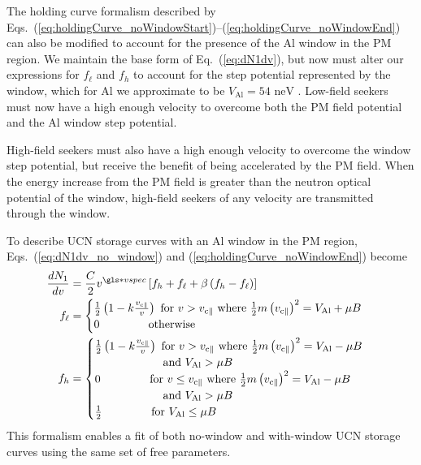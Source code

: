 The holding curve formalism described by Eqs.~(\ref{eq:holdingCurve_noWindowStart})--(\ref{eq:holdingCurve_noWindowEnd}) can also be modified to account for the presence of the Al window in the PM region. We maintain the base form of Eq.~(\ref{eq:dN1dv}), but now must alter our expressions for $f_\ell$ and $f_h$ to account for the step potential represented by the window, which for Al we approximate to be $V_\text{Al}=54\text{ neV}$ \cite{golubUCN}. Low-field seekers must now have a high enough velocity to overcome both the PM field potential and the Al window step potential. 

High-field seekers must also have a high enough velocity to overcome the window step potential, but receive the benefit of being accelerated by the PM field. When the energy increase from the PM field is greater than the neutron optical potential of the window, high-field seekers of any velocity are transmitted through the window.

To describe UCN storage curves with an Al window in the PM region, Eqs.~(\ref{eq:dN1dv_no_window}) and (\ref{eq:holdingCurve_noWindowEnd}) become
%
\begin{align}
     \frac{dN_1}{dv} &= \frac{C}{2}v^{\gls*{vspec}} \left[ f_h + f_\ell + \beta \left( f_h - f_\ell \right)  \right] \label{eq:dN1dv_window}\\
     f_\ell &=\begin{cases}
        \frac{1}{2} \left(1 - k \frac{v_{\text{c}\parallel}}{v} \right) \text{ for }  v>v_{\text{c}\parallel} \text{ where } \frac{1}{2}m \left(v_{\text{c}\parallel}\right)^2 = V_\text{Al} + \mu B\\
        0 \hspace{43pt} \text{otherwise}\end{cases}\\
    f_h &=\begin{cases}
        \frac{1}{2} \left(1 - k \frac{v_{\text{c}\parallel}}{v} \right) \text{ for } v>v_{\text{c}\parallel} \text{ where } \frac{1}{2}m \left(v_{\text{c}\parallel}\right)^2 = V_\text{Al} - \mu B \\ 
        \hspace{60pt} \text{and } V_\text{Al} > \mu B\\
        0 \hspace{40pt} \text{ for } v \leq v_{\text{c}\parallel} \text{ where } \frac{1}{2}m \left(v_{\text{c}\parallel}\right)^2 = V_\text{Al} - \mu B \\ 
        \hspace{60pt} \text{and } V_\text{Al} > \mu B\\
        \frac{1}{2} \hspace{40pt} \text{ for } V_\text{Al} \leq \mu B \label{eq:holdingCurve_windowEnd}  \end{cases}
\end{align}
%
This formalism enables a fit of both no-window and with-window UCN storage curves using the same set of free parameters.

